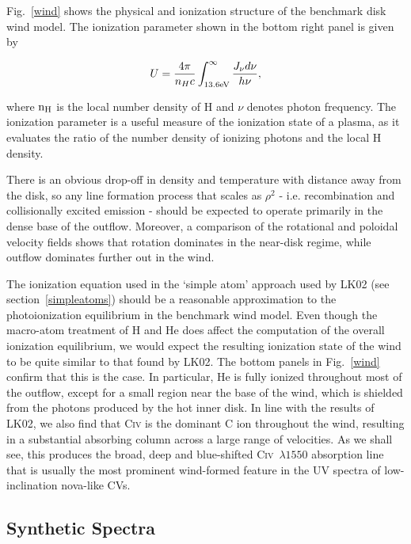 \documentclass[preprint, a4paper, 11pt]{aastex}
\begin{document}
Fig.~\ref{wind} shows the physical and ionization structure 
of the benchmark disk wind model. The ionization parameter shown in the bottom
right panel is given by

\begin{equation}
U = \frac{4\pi}{n_H c}\int_{13.6{\rm{eV}}}^{\infty}\frac{{J_{\nu}d\nu}}{h\nu},
\end{equation}
 
\noindent where $\rm{n_H}$ is the local number density of H and $\nu$ denotes photon 
frequency. The ionization parameter is a useful measure of the ionization state of a plasma, 
as it evaluates the ratio of the number density of ionizing photons and the local 
H density.


There is an obvious drop-off in density
and temperature with distance away from the disk, so any line
formation process that scales as $\rho^2$ - i.e. recombination and
collisionally excited emission - should be expected to operate
primarily in the dense base of the outflow. Moreover, a comparison of
the rotational and poloidal velocity fields shows that rotation
dominates in the near-disk regime, while outflow dominates further out
in the wind. 

The ionization equation used in the `simple atom' approach used by
LK02 (see section~\ref{simpleatoms}) should be a reasonable approximation to
the photoionization equilibrium in the benchmark wind model. Even
though the macro-atom treatment of H and He does affect the 
computation of the overall ionization equilibrium, we would expect the
resulting ionization state of the wind to be quite similar to that
found by LK02. The bottom panels in Fig.~\ref{wind} confirm that this
is the case. In particular, He is fully ionized
throughout most of the outflow, except for a small region near the
base of the wind, which is shielded from the photons produced by the
hot inner disk. In line with the results of LK02, we also find
that C\textsc{iv} is the dominant C ion throughout the wind,
resulting in a substantial absorbing column across a large range of
velocities. As we shall see, this produces the broad, deep and
blue-shifted C\textsc{iv}~$\lambda1550$ absorption line that
is usually the most prominent wind-formed feature in the UV spectra of
low-inclination nova-like CVs.

\subsection{Synthetic Spectra}
\label{modela_spectrum}
\end{document}
